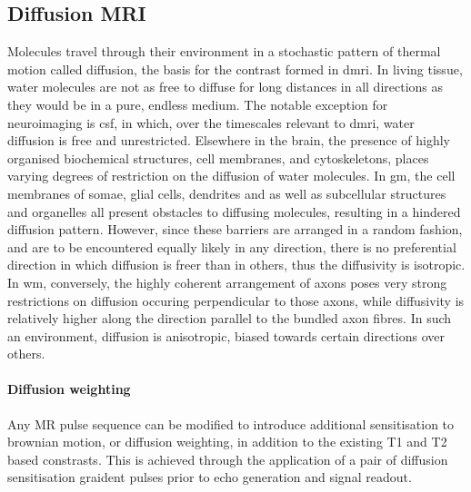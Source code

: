 \subsection{Diffusion MRI}


Molecules travel through their environment in a stochastic pattern of thermal motion called diffusion, the basis for the contrast formed in \gls{dmri}. 
In living tissue, water molecules are not as free to diffuse for long distances in all directions as they would be in a pure, endless medium.
The notable exception for neuroimaging is \gls{csf}, in which, over the timescales relevant to \gls{dmri}, water diffusion is free and unrestricted. 
Elsewhere in the brain, the presence of highly organised biochemical structures, cell membranes, and cytoskeletons, places varying degrees of restriction  on the diffusion of water molecules.
In \gls{gm}, the cell membranes of somae, glial cells, dendrites and  as well as subcellular structures and organelles all present obstacles to diffusing molecules, resulting in a hindered diffusion pattern.
However, since these barriers are arranged in a random fashion, and are to be encountered equally likely in any direction, there is no preferential direction in which diffusion is freer than in others, thus the diffusivity is isotropic.
In \gls{wm}, conversely, the highly coherent arrangement of axons poses very strong restrictions on diffusion occuring perpendicular to those axons, while diffusivity is relatively higher along the direction parallel to the bundled axon fibres.
In such an environment, diffusion is anisotropic, biased towards certain directions over others.

\paragraph*{Diffusion weighting}

Any MR pulse sequence can be modified to introduce additional sensitisation to brownian motion, or diffusion weighting, in addition to the existing T1 and T2 based constrasts.
This is achieved through the application of a pair of diffusion sensitisation graident pulses prior to echo generation and signal readout.

